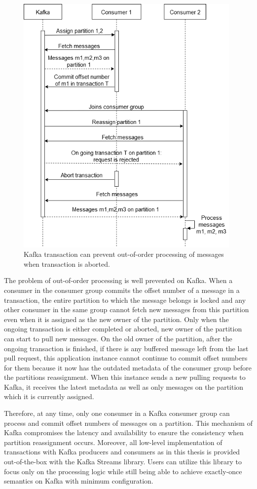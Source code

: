 \begin{figure}[h]
	\centering
	\includegraphics[width=11cm]{images/kafka-transaction-abort.png}
	\caption{Kafka transaction can prevent out-of-order processing of messages when transaction is aborted.}
	\label{fig:kafkatransactionabort}
\end{figure}
The problem of out-of-order processing is well prevented on Kafka. When a consumer in the consumer group commits the offset number of a message in a transaction, the entire partition to which the message belongs is locked and any other consumer in the same group cannot fetch new messages from this partition even when it is assigned as the new owner of the partition. Only when the ongoing transaction is either completed or aborted, new owner of the partition can start to pull new messages. On the old owner of the partition, after the ongoing transaction is finished, if there is any buffered message left from the last pull request, this application instance cannot continue to commit offset numbers for them because it now has the outdated metadata of the consumer group before the partitions reassignment. When this instance sends a new pulling requests to Kafka, it receives the latest metadata as well as only messages on the partition which it is currently assigned.

Therefore, at any time, only one consumer in a Kafka consumer group can process and commit offset numbers of messages on a partition. This mechanism of Kafka compromises the latency and availability to ensure the consistency when partition reassignment occurs. Moreover, all low-level implementation of transactions with Kafka producers and consumers as in this thesis is provided out-of-the-box with the Kafka Streams library. Users can utilize this library to focus only on the processing logic while still being able to achieve exactly-once semantics on Kafka with minimum configuration.


